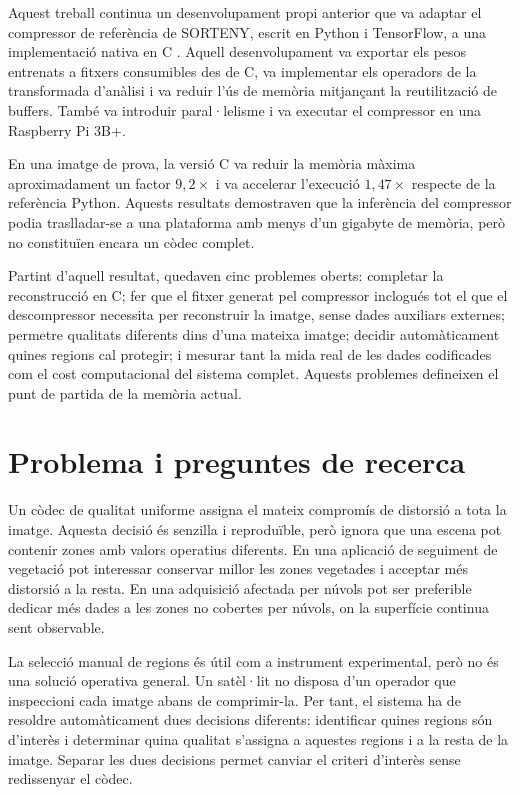 Aquest treball continua un desenvolupament propi anterior que va adaptar el
compressor de referència de SORTENY, escrit en Python i TensorFlow, a una
implementació nativa en C \cite{anez2026treball}. Aquell desenvolupament va
exportar els pesos entrenats a fitxers consumibles des de C, va implementar els
operadors de la transformada d'anàlisi i va reduir l'ús de memòria mitjançant la
reutilització de buffers. També va introduir paral·lelisme i va executar el
compressor en una Raspberry Pi 3B+.

En una imatge de prova, la versió C va reduir la memòria màxima aproximadament
un factor $9,2\times$ i va accelerar l'execució $1,47\times$ respecte de la
referència Python. Aquests resultats demostraven que la inferència del
compressor podia traslladar-se a una plataforma amb menys d'un gigabyte de
memòria, però no constituïen encara un còdec complet.

Partint d'aquell resultat, quedaven cinc problemes oberts: completar la
reconstrucció en C; fer que el fitxer generat pel compressor inclogués tot el
que el descompressor necessita per reconstruir la imatge, sense dades auxiliars
externes; permetre qualitats diferents dins d'una mateixa imatge; decidir
automàticament quines regions cal protegir; i mesurar tant la mida real de les
dades codificades com el cost computacional del sistema complet. Aquests
problemes defineixen el punt de partida de la memòria actual.

\section{Problema i preguntes de recerca}\label{sec:problema}

Un còdec de qualitat uniforme assigna el mateix compromís de distorsió a tota
la imatge. Aquesta decisió és senzilla i reproduïble, però ignora que una
escena pot contenir zones amb valors operatius diferents. En una aplicació de
seguiment de vegetació pot interessar conservar millor les zones vegetades i
acceptar més distorsió a la resta. En una adquisició afectada per núvols pot
ser preferible dedicar més dades a les zones no cobertes per núvols, on la
superfície continua sent observable.

La selecció manual de regions és útil com a instrument experimental, però no
és una solució operativa general. Un satèl·lit no disposa d'un operador que
inspeccioni cada imatge abans de comprimir-la. Per tant, el sistema ha de
resoldre automàticament dues decisions diferents: identificar quines regions
són d'interès i determinar quina qualitat s'assigna a aquestes regions i a la
resta de la imatge. Separar les dues decisions permet canviar el criteri
d'interès sense redissenyar el còdec.

